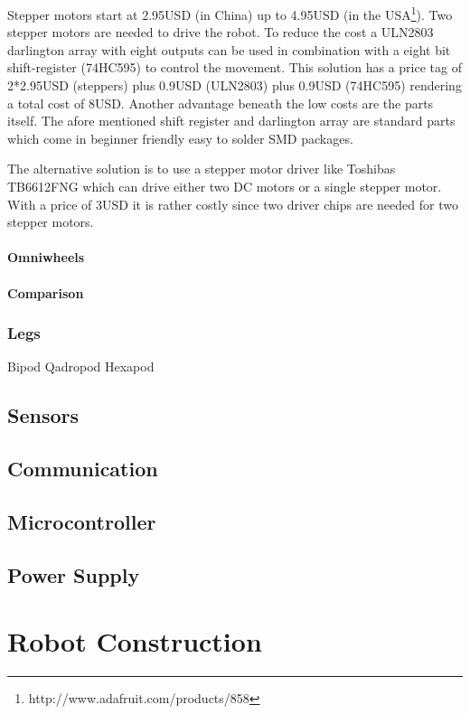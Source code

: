 \documentclass[11pt,a4paper]{article}
\begin{document}
Stepper motors start at 2.95USD (in China) up to 4.95USD (in the USA\footnote{http://www.adafruit.com/products/858}). Two stepper motors are needed to drive the robot. To reduce the cost a ULN2803 darlington array with eight outputs can be used in combination with a eight bit shift-register (74HC595) to control the movement. This solution has a price tag of 2*2.95USD (steppers) plus 0.9USD (ULN2803) plus 0.9USD (74HC595) rendering a total cost of 8USD. Another advantage beneath the low costs are the parts itself. The afore mentioned shift register and darlington array are standard parts which come in beginner friendly easy to solder SMD packages. 

The alternative solution is to use a stepper motor driver like Toshibas TB6612FNG which can drive either two DC motors or a single stepper motor. With a price of 3USD it is rather costly since two driver chips are needed for two stepper motors.

\paragraph{Omniwheels}

\paragraph{Comparison}


\subsubsection{Legs}
Bipod
Qadropod
Hexapod

\subsection{Sensors}
\subsection{Communication}
\subsection{Microcontroller}
\subsection{Power Supply}

\section{Robot Construction}



\nocite{*}
\printbibliography
{}
\end{document}
